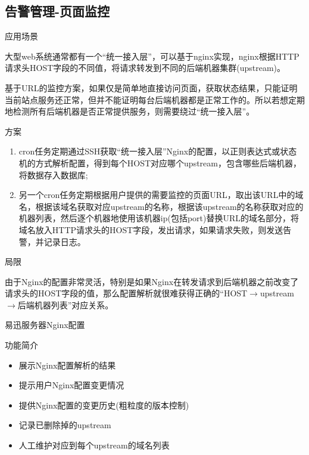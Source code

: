 \documentclass[CJK]{beamer}
\begin{document}
\begin{CJK*}{UTF8}{gbsn}
\subsection{告警管理-页面监控}

\begin{frame}{应用场景}
\begin{block}{}
	大型web系统通常都有一个“统一接入层”，可以基于nginx实现，nginx根据HTTP请求头HOST字段的不同值，将请求转发到不同的后端机器集群(upstream)。
	
	基于URL的监控方案，如果仅是简单地直接访问页面，获取状态结果，只能证明当前站点服务还正常，但并不能证明每台后端机器都是正常工作的。所以若想定期地检测所有后端机器是否正常提供服务，则需要绕过“统一接入层”。
\end{block}
\end{frame}

\begin{frame}{方案}
\begin{block}{}
\begin{enumerate}
\item cron任务定期通过SSH获取“统一接入层”Nginx的配置，以正则表达式或状态机的方式解析配置，得到每个HOST对应哪个upstream，包含哪些后端机器，将数据存入数据库;
\item 另一个cron任务定期根据用户提供的需要监控的页面URL，取出该URL中的域名，根据该域名获取对应upstream的名称，根据该upstream的名称获取对应的机器列表，然后逐个机器地使用该机器ip(包括port)替换URL的域名部分，将域名放入HTTP请求头的HOST字段，发出请求，如果请求失败，则发送告警，并记录日志。
\end{enumerate}
\end{block}
\end{frame}

\begin{frame}{局限}
\begin{block}{}
由于Nginx的配置非常灵活，特别是如果Nginx在转发请求到后端机器之前改变了请求头的HOST字段的值，那么配置解析就很难获得正确的“HOST$\rightarrow$upstream$\rightarrow$后端机器列表”对应关系。
\end{block}
\end{frame}

\begin{frame}{易迅服务器Nginx配置}
\begin{block}{功能简介}
\begin{itemize}
\item 展示Nginx配置解析的结果
\item 提示用户Nginx配置变更情况
\item 提供Nginx配置的变更历史(粗粒度的版本控制)
\item 记录已删除掉的upstream
\item 人工维护对应到每个upstream的域名列表
\end{itemize}
\end{block}


\end{frame}
\end{CJK*}
\end{document}
